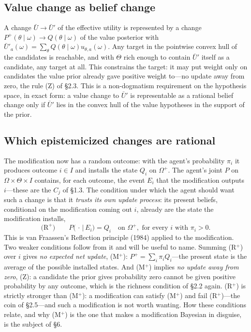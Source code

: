 \documentclass[11pt,a4paper]{article}
\begin{document}
\subsection{Value change as belief change}
A change $\bar U \to \bar U'$ of the effective utility is represented by a change $P^+(\theta \mid \omega) \to Q(\theta \mid \omega)$ of the value posterior with $\bar U'_a(\omega) = \sum_\theta Q(\theta \mid \omega) u_{\theta, a}(\omega)$. Any target in the pointwise convex hull of the candidates is reachable, and with $\Theta$ rich enough to contain $\bar U'$ itself as a candidate, any target at all. This constrains the target: it may put weight only on candidates the value prior already gave positive weight to---no update away from zero, the rule (Z) of \S2.3. This is a non-dogmatism requirement on the hypothesis space, in exact form: a value change to $\bar U'$ is representable as a rational belief change only if $\bar U'$ lies in the convex hull of the value hypotheses in the support of the prior.

\subsection{Which epistemicized changes are rational}
The modification now has a random outcome: with the agent's probability $\pi_i$ it produces outcome $i \in I$ and installs the state $Q_i$ on $\Omega^+$. The agent's joint $P$ on $\Omega \times \Theta \times I$ contains, for each outcome, the event $E_i$ that the modification outputs $i$---these are the $C_j$ of \S1.3. The condition under which the agent should want such a change is that it \emph{trusts its own update process}: its present beliefs, conditional on the modification coming out $i$, already are the state the modification installs,
\[
\text{(R}^+)\qquad P\bigl(\,\cdot\,\big|\, E_i\bigr) = Q_i \quad\text{on } \Omega^+, \text{ for every } i \text{ with } \pi_i > 0.
\]
This is van Fraassen's Reflection principle (1984) applied to the modification. Two weaker conditions follow from it and will be useful to name. Summing (R$^+$) over $i$ gives \emph{no expected net update}, (M$^+$): $P^+ = \sum_i \pi_i Q_i$---the present state is the average of the possible installed states. And (M$^+$) implies \emph{no update away from zero}, (Z): a candidate the prior gives probability zero cannot be given positive probability by any outcome, which is the richness condition of \S2.2 again. (R$^+$) is strictly stronger than (M$^+$): a modification can satisfy (M$^+$) and fail (R$^+$)---the coin of \S2.5---and such a modification is not worth wanting. How these conditions relate, and why (M$^+$) is the one that makes a modification Bayesian in disguise, is the subject of \S6.
\end{document}
